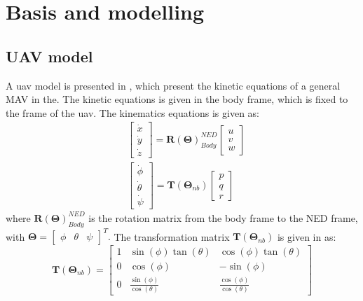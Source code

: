 \chapter{Basis and modelling}
\section{UAV model}
A \gls{uav} model is presented in \citep{beard2012small}, which present the kinetic equations of a general MAV in the. The kinetic equations is given in the body frame, which is fixed to the frame of the \gls{uav}. The kinematics equations is given as:
\begin{subequations}
\label{eq:kinematics}
\begin{align}\label{eq:kinematicsPosition}
& \begin{bmatrix}
\dot{x} \\
\dot{y} \\
\dot{z}
\end{bmatrix}
=
 \mathbf{R}(\mathbf{\Theta})_{Body}^{NED}\begin{bmatrix}
 u \\
 v \\
 w
 \end{bmatrix} \\
& \begin{bmatrix}
\dot{\phi} \\
\dot{\theta} \\
\dot{\psi}
\end{bmatrix}
= 
\mathbf{T}(\mathbf{\Theta}_{nb})\begin{bmatrix}
p \\
q \\
r
\end{bmatrix}\label{eq:kinematicsAttitude}
\end{align}
\end{subequations}
where $\mathbf{R}(\mathbf{\Theta})_{Body}^{NED}$ is the rotation matrix from the body frame to the NED frame, with $\mathbf{\Theta} = \begin{bmatrix}
\phi & \theta & \psi
\end{bmatrix}^T.$ The transformation matrix $\mathbf{T}(\mathbf{\Theta}_{nb})$ is given in \citep{fossen2011handbook} as:
\begin{equation}
\mathbf{T}(\mathbf{\Theta}_{nb}) = \begin{bmatrix}
1 & \sin(\phi)\tan(\theta) & \cos(\phi)\tan(\theta) \\
0 & \cos(\phi) & -\sin(\phi) \\
0 & \frac{\sin(\phi)}{\cos(\theta)} & \frac{\cos(\phi)}{\cos(\theta)}
\end{bmatrix}
\end{equation}
